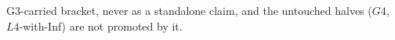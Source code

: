 G3-carried bracket, never as a standalone claim, and the untouched halves ($G4$,
$L4$-with-Inf) are not promoted by it.

